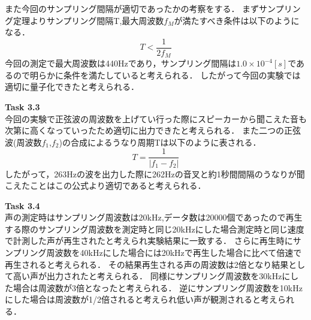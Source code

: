 \documentclass[11pt, a4paper,twocolumn]{jarticle}
\begin{document}
また今回のサンプリング間隔が適切であったかの考察をする．
まずサンプリング定理より\cite{1}サンプリング間隔T,最大周波数$f_M$が満たすべき条件は以下のようになる．
\begin{equation}
    T < \frac{1}{2f_M}
\end{equation}
今回の測定で最大周波数は440Hzであり，サンプリング間隔は$1.0 \times 10^{-4}[s]$であるので明らかに条件を満たしていると考えられる．
したがって今回の実験では適切に量子化できたと考えられる．

\noindent
\textbf{Task 3.3} \\
今回の実験で正弦波の周波数を上げてい行った際にスピーカーから聞こえた音も次第に高くなっていったため適切に出力できたと考えられる．
また二つの正弦波(周波数$f_1$,$f_2$)の合成によるうなり周期Tは以下のように表される．
\begin{equation}
    T = \frac{1}{|f_1-f_2|}
\end{equation}
したがって，263Hzの波を出力した際に262Hzの音叉と約1秒間間隔のうなりが聞こえたことはこの公式より適切であると考えられる．

\noindent
\textbf{Task 3.4} \\
声の測定時はサンプリング周波数は20kHz,データ数は20000個であったので再生する際のサンプリング周波数を測定時と同じ20kHzにした場合測定時と同じ速度で計測した声が再生されたと考えられ実験結果に一致する．
さらに再生時にサンプリング周波数を40kHzにした場合には20kHzで再生した場合に比べて倍速で再生されると考えられる．
その結果再生される声の周波数は2倍となり結果として高い声が出力されたと考えられる．
同様にサンプリング周波数を30kHzにした場合は周波数が3倍となったと考えられる．
逆にサンプリング周波数を10kHzにした場合は周波数が1/2倍されると考えられ低い声が観測されると考えられる．
\newpage
\end{document}
